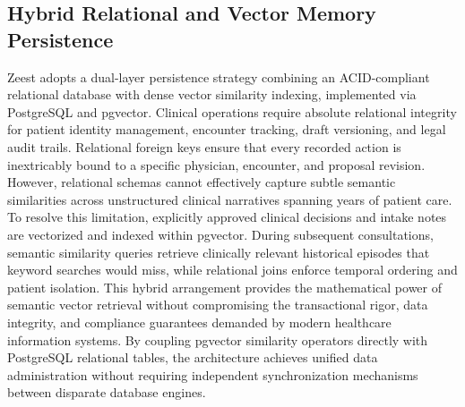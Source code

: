 \subsection{Hybrid Relational and Vector Memory Persistence}
Zeest adopts a dual-layer persistence strategy combining an ACID-compliant relational database with dense vector similarity indexing, implemented via PostgreSQL and pgvector. Clinical operations require absolute relational integrity for patient identity management, encounter tracking, draft versioning, and legal audit trails. Relational foreign keys ensure that every recorded action is inextricably bound to a specific physician, encounter, and proposal revision. However, relational schemas cannot effectively capture subtle semantic similarities across unstructured clinical narratives spanning years of patient care. To resolve this limitation, explicitly approved clinical decisions and intake notes are vectorized and indexed within pgvector. During subsequent consultations, semantic similarity queries retrieve clinically relevant historical episodes that keyword searches would miss, while relational joins enforce temporal ordering and patient isolation. This hybrid arrangement provides the mathematical power of semantic vector retrieval without compromising the transactional rigor, data integrity, and compliance guarantees demanded by modern healthcare information systems. By coupling pgvector similarity operators directly with PostgreSQL relational tables, the architecture achieves unified data administration without requiring independent synchronization mechanisms between disparate database engines.

